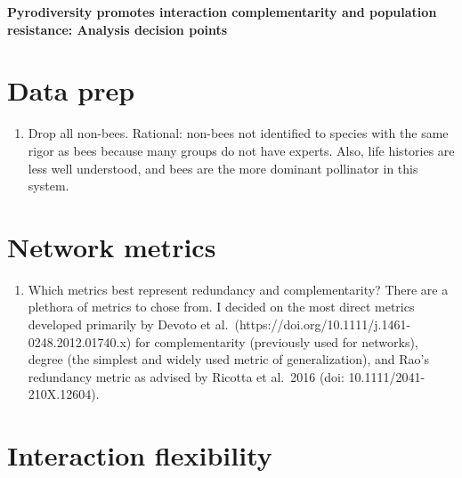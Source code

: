 \documentclass[12pt]{article}
\begin{document}
\begin{centering}
  \large {\bf Pyrodiversity promotes interaction complementarity and
    population resistance: Analysis decision points} \\
\end{centering}
\vspace{0.15in}


\section{Data prep} 
\begin{enumerate}
\item Drop all non-bees. Rational: non-bees not identified to species
  with the same rigor as bees because many groups do not have
  experts. Also, life histories are less well understood, and bees are
  the more dominant pollinator in this system.
\end{enumerate}

\section{Network metrics}
\begin{enumerate}
\item Which metrics best represent redundancy and complementarity?
  There are a plethora of metrics to chose from. I decided on the most
  direct metrics developed primarily by Devoto et al.\
  (https://doi.org/10.1111/j.1461-0248.2012.01740.x) for
  complementarity (previously used for networks), degree (the simplest
  and widely used metric of generalization), and Rao's redundancy
  metric as advised by Ricotta et al.\ 2016 (doi:
  10.1111/2041-210X.12604).
\end{enumerate}

\section{Interaction flexibility}
\end{document}
